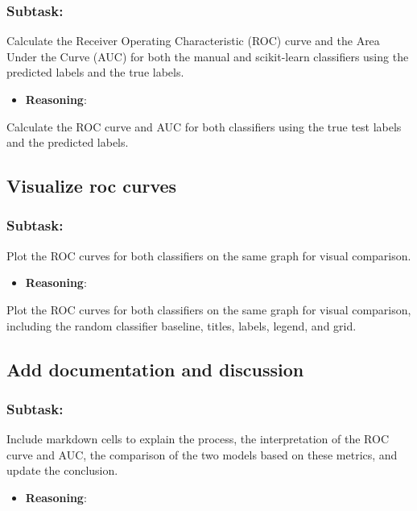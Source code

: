 \documentclass[12pt,a4paper]{article}
\begin{document}
\subsubsection{Subtask:}
Calculate the Receiver Operating Characteristic (ROC) curve and the Area Under the Curve (AUC) for both the manual and scikit-learn classifiers using the predicted labels and the true labels.


\begin{itemize}
    \item \textbf{Reasoning}:
\end{itemize}

Calculate the ROC curve and AUC for both classifiers using the true test labels and the predicted labels.



\subsection{Visualize roc curves}

\subsubsection{Subtask:}
Plot the ROC curves for both classifiers on the same graph for visual comparison.


\begin{itemize}
    \item \textbf{Reasoning}:
\end{itemize}

Plot the ROC curves for both classifiers on the same graph for visual comparison, including the random classifier baseline, titles, labels, legend, and grid.



\subsection{Add documentation and discussion}

\subsubsection{Subtask:}
Include markdown cells to explain the process, the interpretation of the ROC curve and AUC, the comparison of the two models based on these metrics, and update the conclusion.


\begin{itemize}
    \item \textbf{Reasoning}:
\end{itemize}
\end{document}
